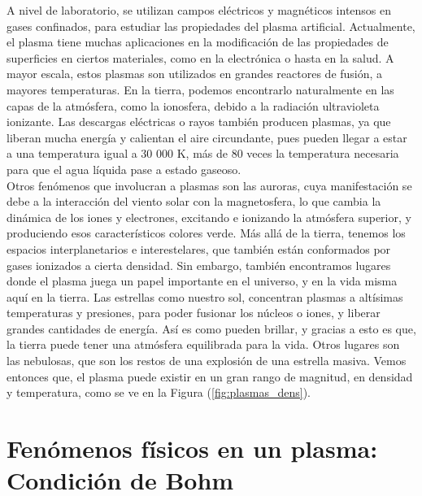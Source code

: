 \documentclass[../main.tex]{subfiles}
\begin{document}
A nivel de laboratorio, se utilizan campos eléctricos y magnéticos intensos en gases confinados, para estudiar las propiedades del plasma artificial. Actualmente, el plasma tiene muchas aplicaciones en la modificación de las propiedades de superficies en ciertos materiales, como en la electrónica o hasta en la salud. A mayor escala, estos plasmas son utilizados en grandes reactores de fusión, a mayores temperaturas. En la tierra, podemos encontrarlo naturalmente en las capas de la atmósfera, como la ionosfera, debido a la radiación ultravioleta ionizante. Las descargas eléctricas o rayos también producen plasmas, ya que liberan mucha energía y calientan el aire circundante, pues pueden llegar a estar a una temperatura igual a 30 000 K, más de 80 veces la temperatura necesaria para que el agua líquida pase a estado gaseoso. \\

Otros fenómenos que involucran a plasmas son las auroras, cuya manifestación se debe a la interacción del viento solar con la magnetosfera, lo que cambia la dinámica de los iones y electrones, excitando e ionizando la atmósfera superior, y produciendo esos característicos colores verde. Más allá de la tierra, tenemos los espacios interplanetarios e interestelares, que también están conformados por gases ionizados a cierta densidad. Sin embargo, también encontramos lugares donde el plasma juega un papel importante en el universo, y en la vida misma aquí en la tierra. Las estrellas como nuestro sol, concentran plasmas a altísimas temperaturas y presiones, para poder fusionar los núcleos o iones, y liberar grandes cantidades de energía. Así es como pueden brillar, y gracias a esto es que, la tierra puede tener una atmósfera equilibrada para la vida. Otros lugares son las nebulosas, que son los restos de una explosión de una estrella masiva. Vemos entonces que, el plasma puede existir en un gran rango de magnitud, en densidad y temperatura, como se ve en la Figura (\ref{fig:plasmas_dens}). 

\section{Fenómenos físicos en un plasma: Condición de Bohm}
\end{document}
